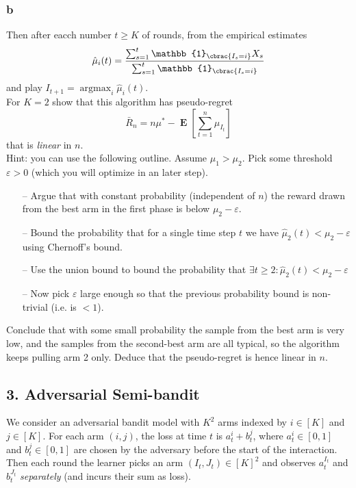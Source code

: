 \documentclass[10pt, a4paper, twoside]{amsart}
\theoremstyle{plain}
\DeclarePairedDelimiter\cbrac\{\}
\newcommand{\Ind}{\ensuremath{\mathbb{1}}}
\newcommand{\argmax}{\operatorname*{argmax}}
\newcommand{\Ev}{\operatorname*{\ensuremath{\mathbf{E}}}} %
\begin{document}
\begin{itemize}
    \subsubsection*{b} Then after eacch number $t \geq K$ of rounds, from the empirical estimates
    \begin{equation*}
        \hat{\mu}_i(t) = \frac{\sum_{s=1}^t \Ind_{\cbrac{I_s = i}} X_s}{\sum_{s=1}^t \Ind_{\cbrac{I_s =i}}}
    \end{equation*}
    and play $I_{t+1} = \argmax_i \hat{\mu}_i(t)$.\\
    For $K = 2$ show that this algorithm has pseudo-regret
    \begin{equation*}
        \bar{R}_n = n\mu^* - \Ev \left[ \sum_{t=1}^n \mu_{I_t} \right]
    \end{equation*}
    that is \textit{linear} in $n$.\\
    Hint: you can use the following outline. Assume $\mu_1 > \mu_2$. Pick some threshold $\varepsilon >0$ (which you will optimize in an later step).
    \begin{itemize}
        \item[--] Argue that with constant probability (independent of $n$) the reward drawn from the best arm in the first phase is below $\mu_2 - \varepsilon$.
        \item[--] Bound the probability that for a single time step $t$ we have $\hat{\mu}_2(t) < \mu_2 - \varepsilon$ using Chernoff's bound.
        \item[--] Use the union bound to bound the probability that $\exists t \geq 2 : \hat{\mu}_2(t) < \mu_2 - \varepsilon$
        \item[--] Now pick $\varepsilon$ large enough so that the previous probability bound is non-trivial (i.e. is $<1$).
    \end{itemize}
    Conclude that with some small probability the sample from the best arm is very low, and the samples from the second-best arm are all typical, so the algorithm keeps pulling arm 2 only. Deduce that the pseudo-regret is hence linear in $n$.
\end{itemize}
\subsection*{3. Adversarial Semi-bandit}
We consider an adversarial bandit model with $K^2$ arms indexed by $i \in [K]$ and $j \in [K]$. For each arm $(i,j)$, the loss at time $t$ is $a_t^i + b_t^j$, where $a_t^i \in [0,1]$ and $b_t^j \in [0,1]$ are chosen by the adversary before the start of the interaction. Then each round the learner picks an arm $(I_t, J_t) \in [K]^2$ and observes $a_t^{I_t}$ and $b_t^{J_t}$ \textit{separately} (and incurs their sum as loss).
\end{document}
